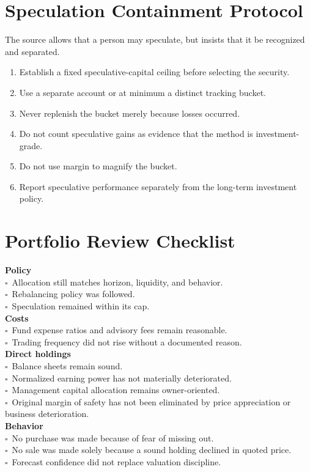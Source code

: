 \documentclass[11pt]{article}
\newcommand{\checkbox}{\(\square\)}
\begin{document}
\section{Speculation Containment Protocol}
The source allows that a person may speculate, but insists that it be recognized and separated.
\begin{enumerate}
\item Establish a fixed speculative-capital ceiling before selecting the security.
\item Use a separate account or at minimum a distinct tracking bucket.
\item Never replenish the bucket merely because losses occurred.
\item Do not count speculative gains as evidence that the method is investment-grade.
\item Do not use margin to magnify the bucket.
\item Report speculative performance separately from the long-term investment policy.
\end{enumerate}

\section{Portfolio Review Checklist}
\begin{worksheetbox}
\textbf{Policy}\\
\checkbox\ Allocation still matches horizon, liquidity, and behavior.\\
\checkbox\ Rebalancing policy was followed.\\
\checkbox\ Speculation remained within its cap.\\[4pt]
\textbf{Costs}\\
\checkbox\ Fund expense ratios and advisory fees remain reasonable.\\
\checkbox\ Trading frequency did not rise without a documented reason.\\[4pt]
\textbf{Direct holdings}\\
\checkbox\ Balance sheets remain sound.\\
\checkbox\ Normalized earning power has not materially deteriorated.\\
\checkbox\ Management capital allocation remains owner-oriented.\\
\checkbox\ Original margin of safety has not been eliminated by price appreciation or business deterioration.\\[4pt]
\textbf{Behavior}\\
\checkbox\ No purchase was made because of fear of missing out.\\
\checkbox\ No sale was made solely because a sound holding declined in quoted price.\\
\checkbox\ Forecast confidence did not replace valuation discipline.
\end{worksheetbox}
\end{document}
